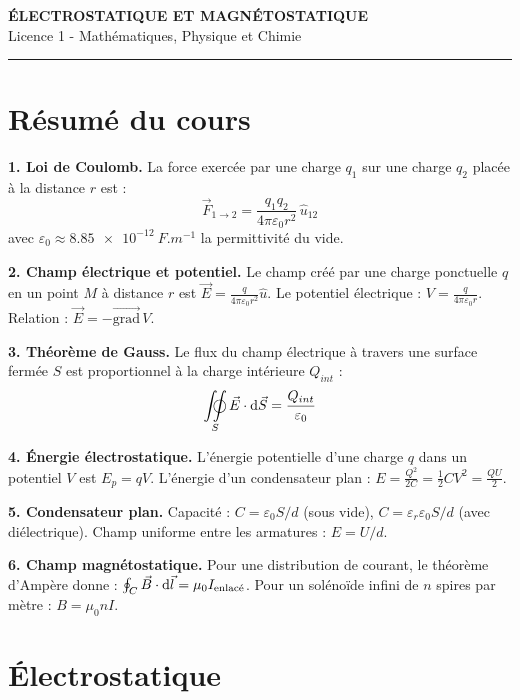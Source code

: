 \documentclass[12pt,a4paper]{article}
\begin{document}
\fi

\begin{center}
  {\LARGE\bfseries ÉLECTROSTATIQUE ET MAGNÉTOSTATIQUE}\\[0.3cm]
  {\normalsize Licence 1 - Mathématiques, Physique et Chimie}\\[0.1cm]
  \rule{0.7\textwidth}{0.8pt}
\end{center}

\section*{Résumé du cours}

\begin{boiteresume}

\textbf{1. Loi de Coulomb.} La force exercée par une charge $q_1$ sur une charge $q_2$ placée à la distance $r$ est :
\[
\vec{F}_{1\to2} = \frac{q_1 q_2}{4\pi\varepsilon_0 r^2}\,\hat{u}_{12}
\]
avec $\varepsilon_0 \approx \qty{8.85e-12}{F.m^{-1}}$ la permittivité du vide.

\textbf{2. Champ électrique et potentiel.} Le champ créé par une charge ponctuelle $q$ en un point $M$ à distance $r$ est $\vec{E} = \frac{q}{4\pi\varepsilon_0 r^2}\hat{u}$. Le potentiel électrique : $V = \frac{q}{4\pi\varepsilon_0 r}$. Relation : $\vec{E} = -\overrightarrow{\text{grad}}\,V$.

\textbf{3. Théorème de Gauss.} Le flux du champ électrique à travers une surface fermée $S$ est proportionnel à la charge intérieure $Q_{int}$ :
\[
\oiint_S \vec{E}\cdot\d\vec{S} = \frac{Q_{int}}{\varepsilon_0}
\]

\textbf{4. Énergie électrostatique.} L'énergie potentielle d'une charge $q$ dans un potentiel $V$ est $E_p = qV$. L'énergie d'un condensateur plan : $E = \frac{Q^2}{2C} = \frac{1}{2}CV^2 = \frac{QU}{2}$.

\textbf{5. Condensateur plan.} Capacité : $C = \varepsilon_0 S/d$ (sous vide), $C = \varepsilon_r\varepsilon_0 S/d$ (avec diélectrique). Champ uniforme entre les armatures : $E = U/d$.

\textbf{6. Champ magnétostatique.} Pour une distribution de courant, le théorème d'Ampère donne :
$\oint_C \vec{B}\cdot\mathrm{d}\vec{l} = \mu_0 I_{\text{enlacé}}$. Pour un solénoïde infini de $n$ spires par mètre : $B = \mu_0 n I$.

\end{boiteresume}

\newpage
\section{Électrostatique}
\end{document}
